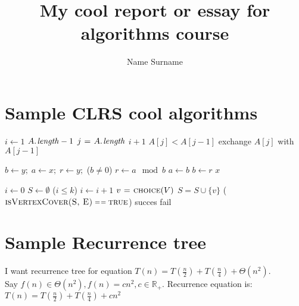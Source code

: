\documentclass[12pt,a4paper]{article}
\title{My cool report or essay for algorithms course}
\author{Name Surname}
\numberwithin{equation}{section}  %
\begin{document}
  \maketitle
 \newpage
 \tableofcontents
  \newpage
  
  \section{Sample CLRS cool algorithms}
  
  \begin{codebox}
  \li \For $i \gets 1$ \To $\attrib{A}{length} - 1$
  \Do
      \li \For $j \gets \attrib{A}{length}$ \Downto $i + 1$
      \Do
	  \li \If $A[j] < A[j - 1]$ 
	   \Do
	   \li   exchange $A[j]$ with $A[j - 1]$
	    \End
	\End
   \End
\end{codebox}

\begin{codebox}
  \li $b \gets y; \; a \gets x; \; r \gets y; $
  \li \While ($b \neq 0$)
      \Do
	  \li $r \gets a \mod b$
	   \li $a \gets b$
	   \li $b \gets r$
      \End
  \li \Return $x$
\end{codebox}

\begin{codebox}
  \li $i \gets 0$ \li $S \gets \emptyset$
  \li \While($i \le k$) \Do
  \li $i \gets i + 1$
  \li $v \mathrel{\hspace{1pt}=\hspace{1pt}} \textnormal{\scshape choice}(V)$
  \li $S = S \cup \{v\}$
  \End
  \li 
\If ($\proc{isVertexCover(S, E)} \isequal \const{true}$)
\li
\Then
\Return succes
\li
\Else
\Return fail
\End
\end{codebox}
  
 \section{Sample Recurrence tree}
 
I want recurrence tree for equation $T(n) = T \left( \frac{n}{2} \right) + T \left(   \frac{n}{4} \right) + \Theta(n^2)$. \\

Say $f(n) \in \Theta (n^2), f(n) = cn^2, c \in \mathbb{R}_+$. Recurrence equation is: $T(n) = T \left(   \frac{n}{2} \right) + T \left(   \frac{n}{4} \right) + cn^2$
\end{document}
